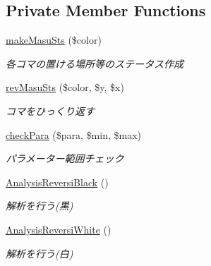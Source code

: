 \subsection*{Private Member Functions}
\begin{DoxyCompactItemize}
\item 
\hyperlink{class_reversi_a88869682786bb7c45c3488113deaa789}{make\+Masu\+Sts} (\$color)
\begin{DoxyCompactList}\small\item\em 各コマの置ける場所等のステータス作成 \end{DoxyCompactList}\item 
\hyperlink{class_reversi_af29cd3f41dc1cffead056dbbed55ae7a}{rev\+Masu\+Sts} (\$color, \$y, \$x)
\begin{DoxyCompactList}\small\item\em コマをひっくり返す \end{DoxyCompactList}\item 
\hyperlink{class_reversi_ac8d57b64bc839c8bb1f53a2a5db11228}{check\+Para} (\$para, \$min, \$max)
\begin{DoxyCompactList}\small\item\em パラメーター範囲チェック \end{DoxyCompactList}\item 
\hyperlink{class_reversi_a471972ec549188f7eb701d57e14ae7a1}{Analysis\+Reversi\+Black} ()
\begin{DoxyCompactList}\small\item\em 解析を行う(黒) \end{DoxyCompactList}\item 
\hyperlink{class_reversi_a3c30afb2509b0782b1c22a8770c68c48}{Analysis\+Reversi\+White} ()
\begin{DoxyCompactList}\small\item\em 解析を行う(白) \end{DoxyCompactList}\end{DoxyCompactItemize}
